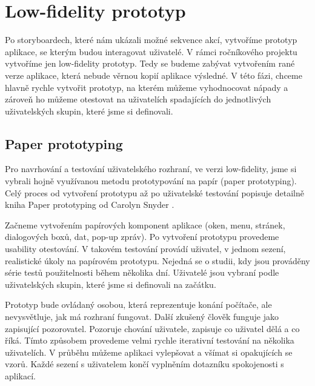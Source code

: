 \chapter{Low-fidelity prototyp}



Po storyboardech, které nám ukázali možné sekvence akcí, vytvoříme prototyp aplikace, se kterým budou interagovat uživatelé. V rámci ročníkového projektu vytvoříme jen low-fidelity prototyp. Tedy se budeme zabývat vytvořením rané verze aplikace, která nebude věrnou kopií aplikace výsledné. V této fázi, chceme hlavně rychle vytvořit prototyp, na kterém můžeme vyhodnocovat nápady a zároveň ho můžeme otestovat na uživatelích spadajících do jednotlivých uživatelských skupin, které jsme si definovali.

\section{Paper prototyping}

Pro navrhování a testování uživatelského rozhraní, ve verzi low-fidelity, jsme si vybrali hojně využívanou metodu prototypování na papír (paper prototyping). Celý proces od vytvoření prototypu až po uživatelské testování popisuje detailně kniha Paper prototyping od Carolyn Snyder \cite{Paper_Prototyping}.

Začneme vytvořením papírových komponent aplikace (oken, menu, stránek, dialogových boxů, dat, pop-up zpráv). 
Po vytvoření prototypu provedeme usability otestování.
V takovém testování provádí uživatel, v jednom sezení, realistické úkoly na papírovém prototypu. Nejedná se o studii, kdy jsou prováděny série testů použitelnosti během několika dní. Uživatelé jsou vybraní podle uživatelských skupin, které jsme si definovali na začátku.

Prototyp bude ovládaný osobou, která reprezentuje konání počítače, ale nevysvětluje, jak má rozhraní fungovat. Další zkušený člověk funguje jako zapisující pozorovatel. Pozoruje chování uživatele, zapisuje co uživatel dělá a co říká. Tímto způsobem provedeme velmi rychle iterativní testování na několika uživatelích. V průběhu můžeme aplikaci vylepšovat a všímat si opakujících se vzorů. Každé sezení s uživatelem končí vyplněním dotazníku spokojenosti s aplikací.

